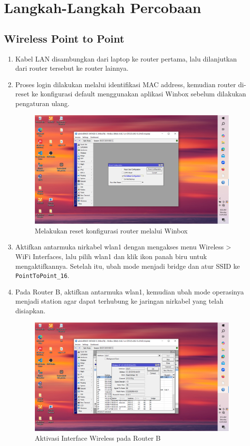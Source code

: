 \section{Langkah-Langkah Percobaan} 
\subsection{Wireless Point to Point}
\begin{enumerate}
    \item Kabel LAN disambungkan dari laptop ke router pertama, lalu dilanjutkan dari router tersebut ke router lainnya.
    \item Proses login dilakukan melalui identifikasi MAC address, kemudian router di-reset ke konfigurasi default menggunakan aplikasi Winbox sebelum dilakukan pengaturan ulang.
    \begin{figure}[H]
        \centering
        \includegraphics[width=0.5\linewidth]{P3/img/gambar1.png}
        \caption{Melakukan reset konfigurasi router melalui Winbox}
        \label{fig:reset-router}
    \end{figure}

    \item Aktifkan antarmuka nirkabel wlan1 dengan mengakses menu Wireless > WiFi Interfaces, lalu pilih wlan1 dan klik ikon panah biru untuk mengaktifkannya. Setelah itu, ubah mode menjadi bridge dan atur SSID ke \texttt{PointToPoint\_16}.

    \item Pada Router B, aktifkan antarmuka wlan1, kemudian ubah mode operasinya menjadi station agar dapat terhubung ke jaringan nirkabel yang telah disiapkan.
    \begin{figure}[H]
        \centering
        \includegraphics[width=0.5\linewidth]{P3/img/gambar3.png}
        \caption{Aktivasi Interface Wireless pada Router B}
        \label{fig:aktif-wlan-b}
    \end{figure}


\end{enumerate}
